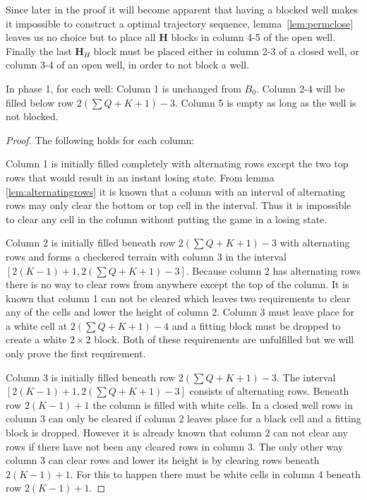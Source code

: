 Since later in the proof it will become apparent that having a blocked well makes it impossible to construct a optimal trajectory sequence, lemma~\ref{lem:permclose} leaves us no choice but to place all $\mathbf{H}$ blocks in column 4-5 of the open well. Finally the last $\mathbf{H}_H$ block must be placed either in column 2-3 of a closed well, or column 3-4 of an open well, in order to not block a well.

\bigbreak

\begin{lem}
In phase 1, for each well: Column 1 is unchanged from $B_0$. Column 2-4 will be filled below row $2 \left( \sum Q + K + 1 \right) - 3$. Column 5 is empty as long as the well is not blocked.
\end{lem}

\begin{proof}
The following holds for each column:

Column 1 is initially filled completely with alternating rows except the two top rows that would result in an instant losing state. From lemma \ref{lem:alternatingrows} it is known that a column with an interval of alternating rows may only clear the bottom or top cell in the interval. Thus it is impossible to clear any cell in the column without putting the game in a losing state. 

Column 2 is initially filled beneath row $2 \left( \sum Q + K + 1 \right) - 3$ with alternating rows and forms a checkered terrain with column 3 in the interval $\left[ 2 \left( K - 1 \right) + 1, 2 \left( \sum Q + K + 1 \right) - 3 \right]$. Because column 2 has alternating rows there is no way to clear rows from anywhere except the top of the column. It is known that column 1 can not be cleared which leaves two requirements to clear any of the cells and lower the height of column 2. Column 3 must leave place for a white cell at $2 \left( \sum Q + K + 1 \right) - 4$ and a fitting block must be dropped to create a white $2 \times 2$ block. Both of these requirements are unfulfilled but we will only prove the first requirement.

Column 3 is initially filled beneath row $2 \left( \sum Q + K + 1 \right) - 3$. The interval $\left[ 2 \left( K - 1 \right) + 1, 2 \left( \sum Q + K + 1 \right) - 3 \right]$ consists of alternating rows. Beneath row $2 \left( K - 1 \right) + 1$ the column is filled with white cells. In a closed well rows in column 3 can only be cleared if column 2 leaves place for a black cell and a fitting block is dropped. However it is already known that column 2 can not clear any rows if there have not been any cleared rows in column 3. The only other way column 3 can clear rows and lower its height is by clearing rows beneath $2 \left( K - 1 \right) + 1$. For this to happen there must be white cells in column 4 beneath row $2 \left( K - 1 \right) + 1$.


\end{proof}
